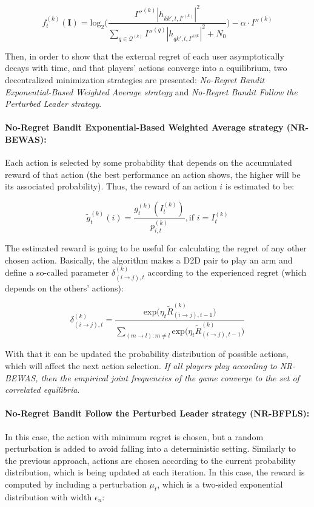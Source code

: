 \documentclass[12pt, a4paper,twoside]{tesi_upf}
\begin{document}
				$$f_t^{(k)}(\textbf{I})=\text{log}_2 \Bigg( \frac{I''^{(k)} |h_{kk',t,I'^{(k)}}|^2}{\sum_{q \in \mathcal{Q}^{(k)}} I''^{(q)} |h_{qk',t,I'^{(qk}}|^2 + N_0 } \Bigg) - \alpha \cdot I''^{(k)}$$
				
				Then, in order to show that the external regret of each user asymptotically decays with time, and that players’ actions converge into a equilibrium, two decentralized minimization strategies are presented: \textit{No-Regret Bandit Exponential-Based Weighted Average strategy} and \textit{No-Regret Bandit Follow the Perturbed Leader strategy}.
				
				\paragraph{No-Regret Bandit Exponential-Based Weighted Average strategy (NR-BEWAS):} Each action is selected by some probability that depends on the accumulated reward of that action (the best performance an action shows, the higher will be its associated probability). Thus, the reward of an action $i$ is estimated to be:
				
				$$ \tilde{g}_t^{(k)}(i)=\frac{g_t^{(k)}(I_t^{(k)})}{p_{i,t}^{(k)}}, \text{if } i=I_t^{(k)} $$
				
				The estimated reward is going to be useful for calculating the regret of any other chosen action. Basically, the algorithm makes a D2D pair to play an arm and define a so-called parameter $\delta_{(i \rightarrow j),t}^{(k)}$ according to the experienced regret (which depends on the others' actions):
				
				$$ \delta_{(i \rightarrow j),t}^{(k)} = \frac{\text{exp}\Big(\eta_t \tilde{R}_{(i \rightarrow j),t-1}^{(k)}\Big)} {\sum_{(m \rightarrow l):m \neq l} \text{exp}\Big(\eta_t \tilde{R}_{(i \rightarrow j),t-1}^{(k)}\Big)} $$ 
				
				With that it can be updated the probability distribution of possible actions, which will affect the next action selection. \textit{If all players play according to NR-BEWAS, then the empirical joint frequencies of the game converge to the set of correlated equilibria}.
				
				\paragraph{No-Regret Bandit Follow the Perturbed Leader strategy (NR-BFPLS):} In this case, the action with minimum regret is chosen, but a random perturbation is added to avoid falling into a deterministic setting. Similarly to the previous approach, actions are chosen according to the current probability distribution, which is being updated at each iteration. In this case, the reward is computed by including a perturbation $\mu_t$, which is a two-sided exponential distribution with width $\epsilon_n$:
				
\end{document}

